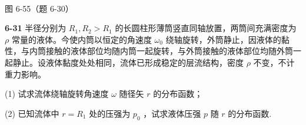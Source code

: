 \begin{center}
\resizebox{0.50\textwidth}{!}{}\\[4pt]
{\small 图 6-55（题 6-30）}
\end{center}

\newpage

\textbf{6-31} 半径分别为 $R_{1}, R_{2} > R_{1}$ 的长圆柱形薄筒竖直同轴放置，两筒间充满密度为 $\rho$ 常量的液体。今使内筒以恒定的角速度 $\omega_{0}$ 绕轴旋转，外筒静止，因液体的黏性，与内筒接触的液体部位均随内筒一起旋转，与外筒接触的液体部位均随外筒一起静止。设液体黏度处处相同，流体已形成稳定的层流结构，密度 $\rho$ 不变，不计重力影响。

(1) 试求流体绕轴旋转角速度 $\omega$ 随径矢 $r$ 的分布函数；

(2) 已知流体中 $r = R_{1}$ 处的压强为 $p_{0}$ ，试求液体压强 $p$ 随 $r$ 的分布函数.

